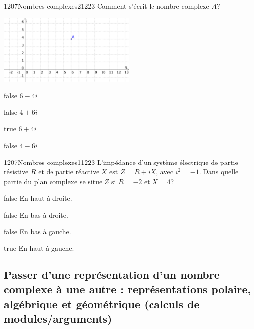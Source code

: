 \documentclass[11pt]{article}
\begin{document}
            \begin{question}{1207}{Nombres complexes}{2}{1223}
                Comment s'écrit le nombre complexe $A$?\\
                \begin{center}
                	\includegraphics[width=0.5\textwidth]{Philippe/Figures_Philippe/complexes_5_1.png}
                \end{center}
            \end{question}

            \begin{reponses}
                \item[false] $6-4i$
                \item[false] $4+6i$
                \item[true] $6+4i$
                \item[false] $4-6i$
            \end{reponses}

            \begin{question}{1207}{Nombres complexes}{1}{1223}
                L'impédance d'un système électrique de partie résistive $R$ et de partie réactive $X$ est $Z = R + iX$, avec $i^2=-1$. Dans quelle partie du plan complexe se situe $Z$ si $R=-2$ et $X=4$?
            \end{question}

            \begin{reponses}
                \item[false] En haut à droite.
                \item[false] En bas à droite.
                \item[false] En bas à gauche.
                \item[true] En haut à gauche.
            \end{reponses}

        \subsection{Passer d'une représentation d'un nombre complexe à une autre : représentations polaire, algébrique et géométrique (calculs de modules/arguments)}
        
\end{document}
